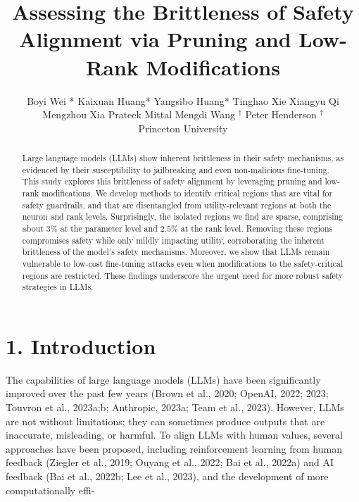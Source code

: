 \documentclass[10pt]{article}
\title{Assessing the Brittleness of Safety Alignment via Pruning and Low-Rank Modifications }
\author{Boyi Wei * Kaixuan Huang* Yangsibo Huang* Tinghao Xie Xiangyu Qi Mengzhou Xia Prateek Mittal Mengdi Wang ${ }^{\dagger}$ Peter Henderson ${ }^{\dagger}$\\
Princeton University}
\date{}
\begin{document}
\maketitle
\captionsetup{singlelinecheck=false}


\begin{abstract}
Large language models (LLMs) show inherent brittleness in their safety mechanisms, as evidenced by their susceptibility to jailbreaking and even non-malicious fine-tuning. This study explores this brittleness of safety alignment by leveraging pruning and low-rank modifications. We develop methods to identify critical regions that are vital for safety guardrails, and that are disentangled from utility-relevant regions at both the neuron and rank levels. Surprisingly, the isolated regions we find are sparse, comprising about $3 \%$ at the parameter level and $2.5 \%$ at the rank level. Removing these regions compromises safety while only mildly impacting utility, corroborating the inherent brittleness of the model's safety mechanisms. Moreover, we show that LLMs remain vulnerable to low-cost fine-tuning attacks even when modifications to the safety-critical regions are restricted. These findings underscore the urgent need for more robust safety strategies in LLMs.
\end{abstract}

\section*{1. Introduction}
The capabilities of large language models (LLMs) have been significantly improved over the past few years (Brown et al., 2020; OpenAI, 2022; 2023; Touvron et al., 2023a;b; Anthropic, 2023a; Team et al., 2023). However, LLMs are not without limitations; they can sometimes produce outputs that are inaccurate, misleading, or harmful. To align LLMs with human values, several approaches have been proposed, including reinforcement learning from human feedback (Ziegler et al., 2019; Ouyang et al., 2022; Bai et al., 2022a) and AI feedback (Bai et al., 2022b; Lee et al., 2023), and the development of more computationally effi-
\end{document}

